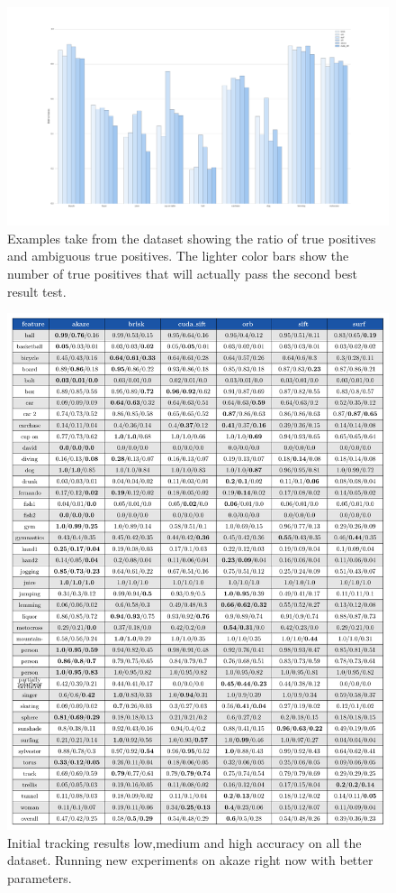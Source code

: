 \begin{figure}[t]
\centerline{%
		\includegraphics[width=0.98\linewidth]{imgs/false_positives.pdf}}
    \vspace{-2mm} 
	\caption{Examples take from the dataset showing the ratio of true positives and ambiguous true positives. The lighter color bars show the number of true positives that will actually pass the second best result test.}
	\label{fig:false_positives}
\end{figure}


\begin{figure}[t]
\centerline{%
		\includegraphics[width=0.98\linewidth]{tables/tracking_precision.pdf}}
    \vspace{-2mm} 
	\caption{Initial tracking results low,medium and high accuracy on all the dataset. Running new experiments on akaze right now with better parameters.}
	\label{fig:false_positives}
\end{figure}